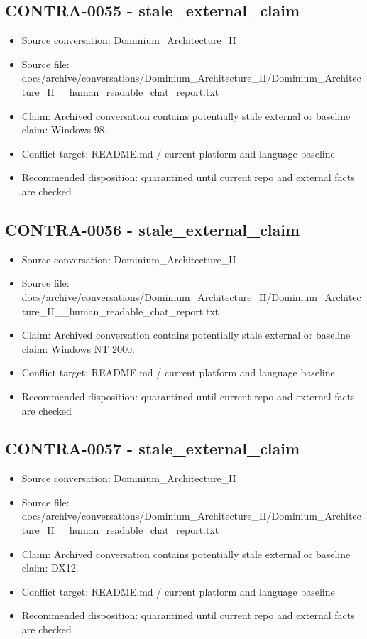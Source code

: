 \documentclass[11pt,a4paper]{report}
\begin{document}
\subsection{CONTRA-0055 - stale\_external\_claim}

\begin{itemize}
\item Source conversation: Dominium\_Architecture\_II
\item Source file: docs/archive/conversations/Dominium\_Architecture\_II/Dominium\_Architecture\_II\_\_human\_readable\_chat\_report.txt
\item Claim: Archived conversation contains potentially stale external or baseline claim: Windows 98.
\item Conflict target: README.md / current platform and language baseline
\item Recommended disposition: quarantined until current repo and external facts are checked
\end{itemize}

\subsection{CONTRA-0056 - stale\_external\_claim}

\begin{itemize}
\item Source conversation: Dominium\_Architecture\_II
\item Source file: docs/archive/conversations/Dominium\_Architecture\_II/Dominium\_Architecture\_II\_\_human\_readable\_chat\_report.txt
\item Claim: Archived conversation contains potentially stale external or baseline claim: Windows NT 2000.
\item Conflict target: README.md / current platform and language baseline
\item Recommended disposition: quarantined until current repo and external facts are checked
\end{itemize}

\subsection{CONTRA-0057 - stale\_external\_claim}

\begin{itemize}
\item Source conversation: Dominium\_Architecture\_II
\item Source file: docs/archive/conversations/Dominium\_Architecture\_II/Dominium\_Architecture\_II\_\_human\_readable\_chat\_report.txt
\item Claim: Archived conversation contains potentially stale external or baseline claim: DX12.
\item Conflict target: README.md / current platform and language baseline
\item Recommended disposition: quarantined until current repo and external facts are checked
\end{itemize}
\end{document}
